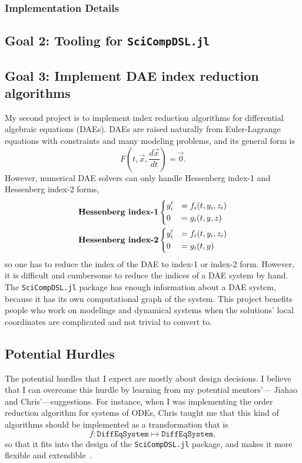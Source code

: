 \documentclass[12pt]{article}
\begin{document}
\subsubsection{Implementation Details}

\subsection{Goal 2: Tooling for \texttt{SciCompDSL.jl}}

\subsection{Goal 3: Implement DAE index reduction algorithms}
My second project is to implement index reduction algorithms for differential
algebraic equations (DAEs). DAEs are raised naturally from Euler-Lagrange
equations with constraints and many modeling problems, and its general form is
\begin{equation}
  F(t, \vec{x}, \frac{d\vec{x}}{dt}) = \vec{0}.
\end{equation}
However, numerical DAE solvers can only handle Hessenberg index-1 and
Hessenberg index-2 forms,
\begin{align}
  &\textbf{Hessenberg index-1}
  \begin{dcases}
    y_i' &= f_i(t,y_i,z_i)\\
    0 &= g_i(t,y,z)
  \end{dcases}\\
  &\textbf{Hessenberg index-2}
  \begin{dcases}
    y'_i &= f_i(t,y_i,z_i)\\
    0 &= g_i(t,y)
  \end{dcases}
\end{align}
so one has to reduce the index of the DAE to index-1 or index-2 form. However,
it is difficult and cumbersome to reduce the indices of a DAE system by hand.
The \texttt{SciCompDSL.jl} package has enough information about a DAE system,
because it has its own computational graph of the system. This project benefits
people who work on modelings and dynamical systems when the solutions' local
coordinates are complicated and not trivial to convert to.

\subsection{Potential Hurdles}
The potential hurdles that I expect are mostly about design decisions. I
believe that I can overcome this hurdle by learning from my potential
mentors'--- Jiahao and Chris'---suggestions. For instance, when I was
implementing the order reduction algorithm for systems of ODEs, Chris taught me
that this kind of algorithms should be implemented as a transformation that is
\[
  f: \texttt{DiffEqSystem}\mapsto \texttt{DiffEqSystem},
\]
so that it fits into the design of the \texttt{SciCompDSL.jl} package, and
makes it more flexible and extendible~\cite{i49}.
\end{document}
